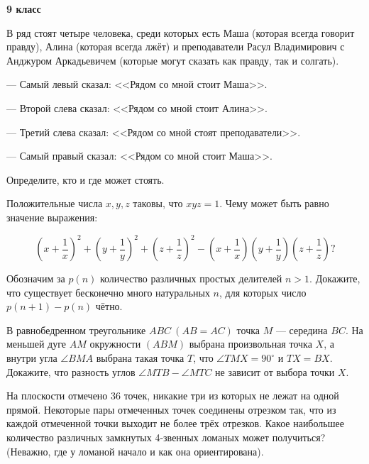 \hspace{3mm}

\centerline{\bf \Huge 9 класс}

\begin{flushright}
        \scriptsize{}
\end{flushright}

В ряд стоят четыре человека, среди которых есть Маша (которая всегда говорит правду), Алина (которая всегда лжёт) и преподаватели Расул Владимирович с Анджуром Аркадьевичем (которые могут сказать как правду, так и солгать).

--- Самый левый сказал: <<Рядом со мной стоит Маша>>.

--- Второй слева сказал: <<Рядом со мной стоит Алина>>.

--- Третий слева сказал: <<Рядом со мной стоят преподаватели>>.

--- Самый правый сказал: <<Рядом со мной стоит Маша>>.

Определите, кто и где может стоять.

Положительные числа $x,y,z$ таковы, что $xyz=1$. Чему может быть равно значение выражения:

$$
\left(x+\frac{1}{x}\right)^2+\left(y+\frac{1}{y}\right)^2+\left(z+\frac{1}{z}\right)^2-\left(x+\frac{1}{x}\right)\left(y+\frac{1}{y}\right)\left(z+\frac{1}{z}\right) ?
$$


Обозначим за $p(n)$ количество различных простых делителей $n>1$. Докажите, что существует бесконечно много натуральных $n$, для которых число $p(n+1)-p(n)$ чётно.


В равнобедренном треугольнике $A B C\ (A B=A C)$ точка $M$ --- середина $B C$. На меньшей дуге $A M$ окружности $(A B M)$ выбрана произвольная точка $X$, а внутри угла $\angle B M A$ выбрана такая точка $T$, что $\angle T M X=90^{\circ}$ и $T X=B X$. Докажите, что разность углов $\angle M T B-\angle M T C$ не зависит от выбора точки $X$.

На плоскости отмечено 36 точек, никакие три из которых не лежат на одной прямой. Некоторые пары отмеченных точек соединены отрезком так, что из каждой отмеченной точки выходит не более трёх отрезков. Какое наибольшее количество различных замкнутых 4-звенных ломаных может получиться? (Неважно, где у ломаной начало и как она ориентирована).
